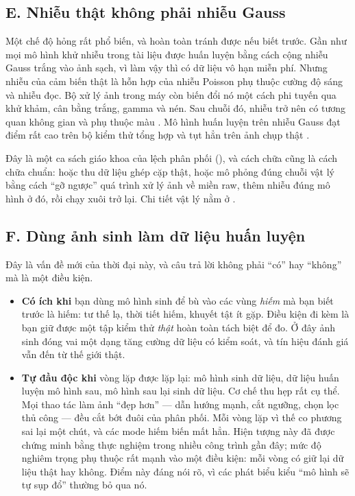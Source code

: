 \documentclass[../../../deep_learning.tex]{subfiles}
\begin{document}
\subsection{E. Nhiễu thật không phải nhiễu Gauss}
Một chế độ hỏng rất phổ biến, và hoàn toàn tránh được nếu biết trước. Gần như mọi mô hình khử nhiễu trong tài liệu được huấn luyện bằng cách cộng nhiễu Gauss trắng vào ảnh sạch, vì làm vậy thì có dữ liệu vô hạn miễn phí. Nhưng nhiễu của cảm biến thật là hỗn hợp của nhiễu Poisson phụ thuộc cường độ sáng và nhiễu đọc. Bộ xử lý ảnh trong máy còn biến đổi nó một cách phi tuyến qua khử khảm, cân bằng trắng, gamma và nén. Sau chuỗi đó, nhiễu trở nên có tương quan không gian và phụ thuộc màu \cite{brooks2019unprocessing}. Mô hình huấn luyện trên nhiễu Gauss đạt điểm rất cao trên bộ kiểm thử tổng hợp và tụt hẳn trên ảnh chụp thật \cite{abdelhamed2018sidd}.

Đây là một ca sách giáo khoa của lệch phân phối (), và cách chữa cũng là cách chữa chuẩn: hoặc thu dữ liệu ghép cặp thật, hoặc mô phỏng đúng chuỗi vật lý bằng cách ``gỡ ngược'' quá trình xử lý ảnh về miền raw, thêm nhiễu đúng mô hình ở đó, rồi chạy xuôi trở lại. Chi tiết vật lý nằm ở .

\subsection{F. Dùng ảnh sinh làm dữ liệu huấn luyện}
Đây là vấn đề mới của thời đại này, và câu trả lời không phải ``có'' hay ``không'' mà là một điều kiện.

\begin{itemize}
\item \textbf{Có ích khi} bạn dùng mô hình sinh để bù vào các vùng \emph{hiếm} mà bạn biết trước là hiếm: tư thế lạ, thời tiết hiếm, khuyết tật ít gặp. Điều kiện đi kèm là bạn giữ được một tập kiểm thử \emph{thật} hoàn toàn tách biệt để đo. Ở đây ảnh sinh đóng vai một dạng tăng cường dữ liệu có kiểm soát, và tín hiệu đánh giá vẫn đến từ thế giới thật.
\item \textbf{Tự đầu độc khi} vòng lặp được lặp lại: mô hình sinh dữ liệu, dữ liệu huấn luyện mô hình sau, mô hình sau lại sinh dữ liệu. Cơ chế thu hẹp rất cụ thể. Mọi thao tác làm ảnh ``đẹp hơn'' --- dẫn hướng mạnh, cắt ngưỡng, chọn lọc thủ công --- đều cắt bớt đuôi của phân phối. Mỗi vòng lặp vì thế co phương sai lại một chút, và các mode hiếm biến mất hẳn. Hiện tượng này đã được chứng minh bằng thực nghiệm trong nhiều công trình gần đây; mức độ nghiêm trọng phụ thuộc rất mạnh vào một điều kiện: mỗi vòng có giữ lại dữ liệu thật hay không. Điểm này đáng nói rõ, vì các phát biểu kiểu ``mô hình sẽ tự sụp đổ'' thường bỏ qua nó.
\end{itemize}
\end{document}
